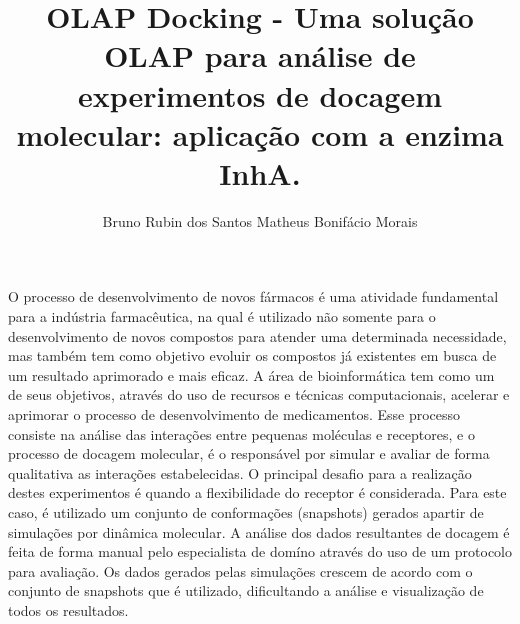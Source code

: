 \documentclass[portuguese,twoside]{pucrs-ppgcc}
\author{Bruno Rubin dos Santos Matheus Bonifácio Morais}
\title{OLAP Docking - Uma solução OLAP para análise de experimentos de docagem molecular: aplicação com a enzima InhA.}
      {OLAP Docking - An OLAP solution to analyze molecular docking experiments: applied to InhA enzyme.}
\begin{document}



%
%
%

\begin{resumo}
O processo de desenvolvimento de novos fármacos é uma atividade fundamental para a indústria farmacêutica, na qual é utilizado não somente para o desenvolvimento de novos compostos para atender uma determinada necessidade, mas também tem como objetivo evoluir os compostos já existentes em busca de um resultado aprimorado e mais eficaz. A área de bioinformática tem como um de seus objetivos, através do uso de recursos e técnicas computacionais, acelerar e aprimorar o processo de desenvolvimento de medicamentos.
Esse processo consiste na análise das interações entre pequenas moléculas e receptores, e o processo de docagem molecular, é o responsável por simular e avaliar de forma qualitativa as interações estabelecidas.  O principal desafio para a realização destes experimentos é quando a flexibilidade do receptor é considerada. Para este caso, é utilizado um conjunto de conformações (snapshots) gerados apartir de simulações por dinâmica molecular.
A análise dos dados resultantes de docagem é feita de forma manual pelo especialista de domíno através do uso de um protocolo para avaliação. Os dados gerados pelas simulações crescem de acordo com o conjunto de snapshots que é utilizado, dificultando a análise e visualização de todos os resultados. 

\end{resumo}
\end{document}
